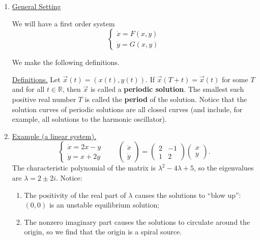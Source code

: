 \documentclass[11pt, letterpaper, oneside]{article}     %
\numberwithin{equation}{subsection}
\theoremstyle{definition}
\numberwithin{theorem}{section}
\theoremstyle{remark}
\newcommand{\RR}{\mathbb{R}}
\begin{document}
\begin{enumerate}
\item \underline{General Setting}

  We will have a first order system
  \begin{equation}
    \begin{cases}
      \dot x = F(x,y)\\
      \dot y = G(x,y)
    \end{cases}
  \end{equation}

  We make the following definitions.

  \underline{Definitions.} Let $\vec x(t) = (x(t),y(t))$. If $\vec x(T + t) = \vec x(t)$ for some $T$ and for all $t\in \RR$, then $\vec x$ is called a \textbf{periodic solution}. The smallest such positive real number $T$ is called the \textbf{period} of the solution. Notice that the solution curves of periodic solutions are all closed curves (and include, for example, all solutions to the harmonic oscillator).

  \medskip

\item \underline{Example (a linear system).}
  \begin{equation}
    \begin{cases}
      \dot x = 2x-y\\
      \dot y = x + 2y
    \end{cases}
    \quad\quad
    \begin{pmatrix}
      \dot x \\ \dot y
    \end{pmatrix}
    =
    \begin{pmatrix}
      2 & -1\\
      1 & 2
    \end{pmatrix}
    \begin{pmatrix}
      x \\ y
    \end{pmatrix}.
  \end{equation}
  The characteristic polynomial of the matrix is $\lambda^2 - 4\lambda + 5$, so the eigenvalues are $\lambda = 2\pm2i$. Notice:
  \begin{enumerate}
  \item The positivity of the real part of $\lambda$ causes the solutions to ``blow up'': $(0,0)$ is an unstable equilibrium solution;
  \item The nonzero imaginary part causes the solutions to circulate around the origin, so we find that the origin is a spiral source.
  \end{enumerate}


\end{enumerate}
\end{document}
